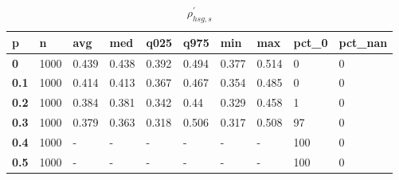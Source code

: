 \begin{table}[h]
 \centering 
\footnotesize
\caption{$\rho_{hsg,s}^\prime $}
\label{tab:alphahsgs}
\begin{tabular}[h]{|l|l|l|l|l|l|l|l|l|l|
    } \hline
\textbf{ p} & \textbf{ n} & \textbf{ avg} & \textbf{ med} & \textbf{ q025} & \textbf{ q975} & \textbf{ min} & \textbf{ max} & \textbf{ pct\_0} & \textbf{ pct\_nan}
    \\ \hline
  \textbf{  0} & 1000 & 0.439 & 0.438 & 0.392 & 0.494 & 0.377 & 0.514 &   0 & 0
    \\ \hline
  \textbf{0.1} & 1000 & 0.414 & 0.413 & 0.367 & 0.467 & 0.354 & 0.485 &   0 & 0
    \\ \hline
  \textbf{0.2} & 1000 & 0.384 & 0.381 & 0.342 &  0.44 & 0.329 & 0.458 &   1 & 0
    \\ \hline
  \textbf{0.3} & 1000 & 0.379 & 0.363 & 0.318 & 0.506 & 0.317 & 0.508 &  97 & 0
    \\ \hline
  \textbf{0.4} & 1000 & - & - & - & - & - & - & 100 & 0
    \\ \hline
  \textbf{0.5} & 1000 & - & - & - & - & - & - & 100 & 0
    \\ \hline
 \end{tabular}
 \end{table}
